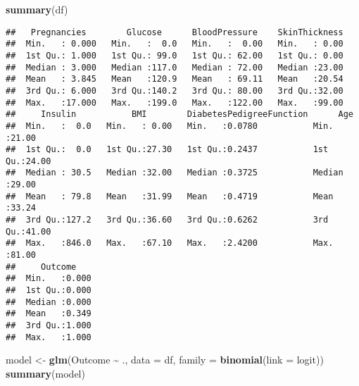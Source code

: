 \documentclass[
]{article}
\newenvironment{Shaded}{\begin{snugshade}}{\end{snugshade}}
\newcommand{\AttributeTok}[1]{\textcolor[rgb]{0.13,0.29,0.53}{#1}}
\newcommand{\FunctionTok}[1]{\textcolor[rgb]{0.13,0.29,0.53}{\textbf{#1}}}
\newcommand{\NormalTok}[1]{#1}
\newcommand{\OtherTok}[1]{\textcolor[rgb]{0.56,0.35,0.01}{#1}}
\newcommand{\SpecialCharTok}[1]{\textcolor[rgb]{0.81,0.36,0.00}{\textbf{#1}}}
\newcommand{\StringTok}[1]{\textcolor[rgb]{0.31,0.60,0.02}{#1}}
\begin{document}
\begin{Shaded}
\begin{Highlighting}[]
\FunctionTok{summary}\NormalTok{(df)}
\end{Highlighting}
\end{Shaded}

\begin{verbatim}
##   Pregnancies        Glucose      BloodPressure    SkinThickness  
##  Min.   : 0.000   Min.   :  0.0   Min.   :  0.00   Min.   : 0.00  
##  1st Qu.: 1.000   1st Qu.: 99.0   1st Qu.: 62.00   1st Qu.: 0.00  
##  Median : 3.000   Median :117.0   Median : 72.00   Median :23.00  
##  Mean   : 3.845   Mean   :120.9   Mean   : 69.11   Mean   :20.54  
##  3rd Qu.: 6.000   3rd Qu.:140.2   3rd Qu.: 80.00   3rd Qu.:32.00  
##  Max.   :17.000   Max.   :199.0   Max.   :122.00   Max.   :99.00  
##     Insulin           BMI        DiabetesPedigreeFunction      Age       
##  Min.   :  0.0   Min.   : 0.00   Min.   :0.0780           Min.   :21.00  
##  1st Qu.:  0.0   1st Qu.:27.30   1st Qu.:0.2437           1st Qu.:24.00  
##  Median : 30.5   Median :32.00   Median :0.3725           Median :29.00  
##  Mean   : 79.8   Mean   :31.99   Mean   :0.4719           Mean   :33.24  
##  3rd Qu.:127.2   3rd Qu.:36.60   3rd Qu.:0.6262           3rd Qu.:41.00  
##  Max.   :846.0   Max.   :67.10   Max.   :2.4200           Max.   :81.00  
##     Outcome     
##  Min.   :0.000  
##  1st Qu.:0.000  
##  Median :0.000  
##  Mean   :0.349  
##  3rd Qu.:1.000  
##  Max.   :1.000
\end{verbatim}

\begin{Shaded}
\begin{Highlighting}[]
\NormalTok{model }\OtherTok{\textless{}{-}} \FunctionTok{glm}\NormalTok{(Outcome }\SpecialCharTok{\textasciitilde{}}\NormalTok{ ., }\AttributeTok{data =}\NormalTok{ df, }\AttributeTok{family =} \FunctionTok{binomial}\NormalTok{(}\AttributeTok{link =} \StringTok{\textquotesingle{}logit\textquotesingle{}}\NormalTok{))}
\FunctionTok{summary}\NormalTok{(model)}
\end{Highlighting}
\end{Shaded}
\end{document}
